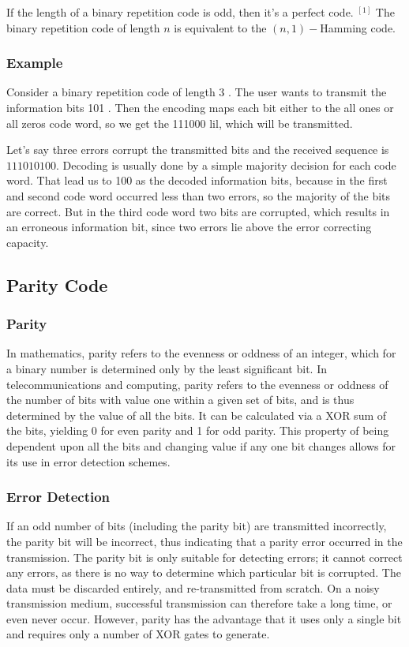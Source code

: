 \documentclass[11pt, a4paper]{article}
\begin{document}
If the length of a binary repetition code is odd, then it's a perfect code. ${ }^{[1]}$ The binary repetition code of length $n$ is equivalent to the $(n, 1)-$Hamming code.
\subsubsection{Example}
Consider a binary repetition code of length 3 . The user wants to transmit the information bits 101 . Then the encoding maps each bit
either to the all ones or all zeros code word, so we get the 111000 lil, which will be transmitted.

Let's say three errors corrupt the transmitted bits and the received sequence is $111010100 .$ Decoding is usually done by a simple majority decision for each code word. That lead us to 100 as the decoded information bits, because in the first and second code word occurred less than two errors, so the majority of the bits are correct. But in the third code word two bits are corrupted, which results in an
erroneous information bit, since two errors lie above the error correcting capacity.
\subsection{Parity Code}
\subsubsection{Parity}
In mathematics, parity refers to the evenness or oddness of an integer, which for a binary number is determined only by the least
significant bit. In telecommunications and computing, parity refers to the evenness or oddness of the number of bits with value one within
a given set of bits, and is thus determined by the value of all the bits. It can be calculated via a XOR sum of the bits, yielding 0 for even parity and 1 for odd parity. This property of being dependent upon all the bits and changing value if any one bit changes allows for its use in error detection schemes.
\subsubsection{Error Detection}
If an odd number of bits (including the parity bit) are transmitted incorrectly, the parity bit will be incorrect, thus indicating that a parity error occurred in the transmission. The parity bit is only suitable for detecting errors; it cannot correct any errors, as there is no way to determine which particular bit is corrupted. The data must be discarded entirely, and re-transmitted from scratch. On a noisy transmission medium, successful transmission can therefore take a long time, or even never occur. However, parity has the advantage that it uses only a single bit and requires only a number of XOR gates to generate.
\end{document}
